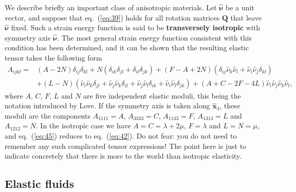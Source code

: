 We describe briefly an important class of anisotropic materials. Let $\hat{\bm{\nu}}$ be a unit vector, 
and suppose that eq.~(\ref{eq:39}) holds for all rotation matrices $\mathbf{Q}$ that leave $\hat{\bm{\nu}}$ fixed. Such a 
strain energy function is said to be \textbf{transversely isotropic} with symmetry axis $\hat{\bm{\nu}}$. The most general 
strain energy function consistent with this condition has been determined, and it can be shown that the resulting elastic tensor 
takes the following form
\begin{equation}
\begin{split}
A_{ijkl} = {}&(A-2N)\delta_{ij}\delta_{kl} + N(\delta_{ik}\delta_{jl} + \delta_{il}\delta_{jk})
+ (F-A+2N)(\delta_{ij}\hat{\nu}_{k}\hat{\nu}_{l} + \hat{\nu}_{i}\hat{\nu}_{j}\delta_{kl}) \\
&+ (L-N)(\hat{\nu}_{i}\hat{\nu}_{k}\delta_{jl} + \hat{\nu}_{j}\hat{\nu}_{k}\delta_{il} + \hat{\nu}_{j}\hat{\nu}_{l}\delta_{ik} + \hat{\nu}_{i}\hat{\nu}_{l}\delta_{jk})
+ (A+C-2F-4L)\hat{\nu}_{i}\hat{\nu}_{j}\hat{\nu}_{k}\hat{\nu}_{l},
\end{split}
\label{eq:45}
\end{equation}
where $A$, $C$, $F$, $L$ and $N$ are five independent elastic moduli, this being the notation introduced by Love. 
If the symmetry axis is taken along $\hat{\mathbf{x}}_{3}$, these moduli are the components $A_{1111}=A$, $A_{3333}=C$, $A_{1133}=F$, 
$A_{1313}=L$ and $A_{1212}=N$. In the isotropic case we have $A=C=\lambda+2\mu$, $F=\lambda$ and $L=N=\mu$, and 
eq.~(\ref{eq:45}) reduces to eq.~(\ref{eq:42}). Do not fear: 
you do not need to remember any such complicated tensor expressions! The point here is just to indicate concretely that 
there is more to the world than isotropic elasticity.

\subsection*{Elastic fluids}

